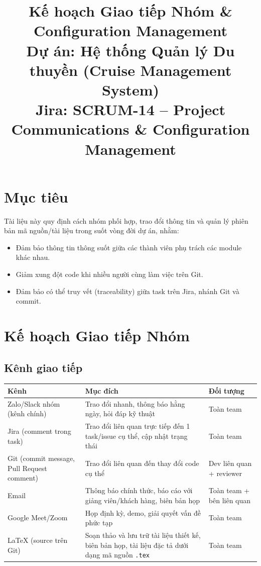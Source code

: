 \documentclass[a4paper,11pt]{article}
\title{\textbf{Kế hoạch Giao tiếp Nhóm \& Configuration Management}\\[4pt]
\large Dự án: Hệ thống Quản lý Du thuyền (Cruise Management System)\\
\normalsize Jira: SCRUM-14 -- Project Communications \& Configuration Management}
\author{}
\date{}
\begin{document}
\maketitle
\vspace{-1.5cm}
\tableofcontents
\vspace{0.5cm}

\section{Mục tiêu}

Tài liệu này quy định cách nhóm phối hợp, trao đổi thông tin và quản lý phiên bản mã nguồn/tài liệu trong suốt vòng đời dự án, nhằm:

\begin{itemize}[leftmargin=1.2cm]
  \item Đảm bảo thông tin thông suốt giữa các thành viên phụ trách các module khác nhau.
  \item Giảm xung đột code khi nhiều người cùng làm việc trên Git.
  \item Đảm bảo có thể truy vết (traceability) giữa task trên Jira, nhánh Git và commit.
\end{itemize}

\section{Kế hoạch Giao tiếp Nhóm}

\subsection{Kênh giao tiếp}

\begin{longtable}{L{4.2cm} L{5.3cm} L{3.5cm}}
\toprule
\textbf{Kênh} & \textbf{Mục đích} & \textbf{Đối tượng} \\
\midrule
\endhead
Zalo/Slack nhóm (kênh chính) & Trao đổi nhanh, thông báo hằng ngày, hỏi đáp kỹ thuật & Toàn team \\
Jira (comment trong task) & Trao đổi liên quan trực tiếp đến 1 task/issue cụ thể, cập nhật trạng thái & Toàn team \\
Git (commit message, Pull Request comment) & Trao đổi liên quan đến thay đổi code cụ thể & Dev liên quan + reviewer \\
Email & Thông báo chính thức, báo cáo với giảng viên/khách hàng, biên bản họp & Toàn team + bên liên quan \\
Google Meet/Zoom & Họp định kỳ, demo, giải quyết vấn đề phức tạp & Toàn team \\
LaTeX (source trên Git) & Soạn thảo và lưu trữ tài liệu thiết kế, biên bản họp, tài liệu đặc tả dưới dạng mã nguồn \texttt{.tex} & Toàn team \\
\bottomrule
\end{longtable}
\end{document}
